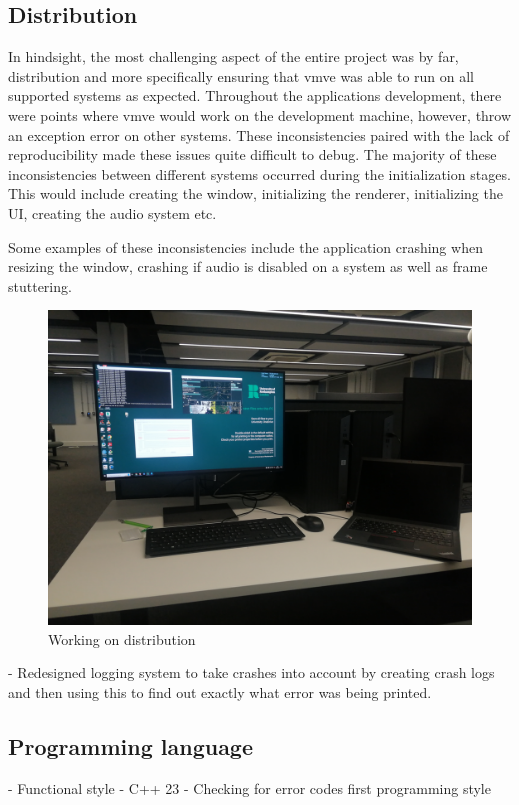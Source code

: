 \documentclass[11pt]{article}
\begin{document}
\subsection{Distribution}
In hindsight, the most challenging aspect of the entire project was by far,
distribution and more specifically ensuring that \gls*{vmve} was able to run on all
supported systems as expected. Throughout the applications development, there
were points where \gls*{vmve} would work on the development machine, however,
throw an exception error on other systems. These inconsistencies paired with the
lack of reproducibility made these issues quite difficult to debug. The majority
of these inconsistencies between different systems occurred during the
initialization stages. This would include creating the window, initializing the
renderer, initializing the UI, creating the audio system etc.

Some examples of these inconsistencies include the application crashing when
resizing the window, crashing if audio is disabled on a system as well as frame
stuttering.

\begin{figure}[H]
  \centering
  \includegraphics[width=\textwidth]{images/multiple_systems.png}
  \caption{Working on distribution}
  \label{fig:multiple_systems}
\end{figure}




- Redesigned logging system to take crashes into account by creating crash logs
 and then using this to find out exactly what error was being printed.

\subsection{Programming language}
- Functional style
- C++ 23
- Checking for error codes first programming style
\end{document}
